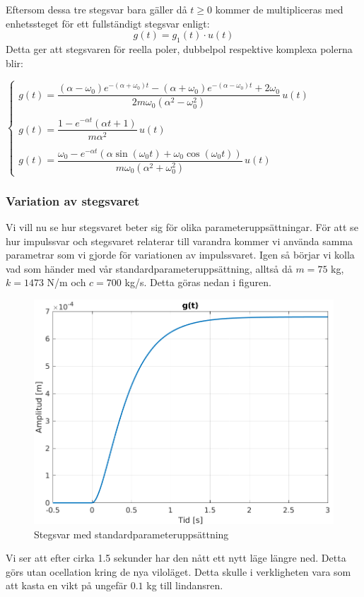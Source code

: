 Eftersom dessa tre stegsvar bara gäller då $t\ge 0$ kommer de multipliceras med enhetssteget för ett fullständigt stegsvar enligt:
$$g(t)=g_1(t)\cdot u(t)$$
Detta ger att stegsvaren för reella poler, dubbelpol respektive komplexa polerna blir:

$\begin{cases}
g(t)=\dfrac{(\alpha-\omega_0)e^{-(\alpha+\omega_0)t}-(\alpha+\omega_0)e^{-(\alpha-\omega_0)t}+2\omega_0}{2m\omega_0(\alpha^2-\omega_0^2)}\,u(t) \\\\
g(t)=\dfrac{1-e^{-\alpha t}(\alpha t+1)}{m\alpha^2}\,u(t) \\\\
g(t)=\dfrac{\omega_0-e^{-\alpha t}(\alpha\sin(\omega_0 t)+\omega_0\cos(\omega_0 t))}{m\omega_0(\alpha^2+\omega_0^2)}\,u(t)
\end{cases}$


\newpage
\subsubsection{Variation av stegsvaret}
Vi vill nu se hur stegsvaret beter sig för olika parameteruppsättningar. För att se hur impulssvar och stegsvaret relaterar till varandra kommer vi använda samma parametrar som vi gjorde för variationen av impulssvaret. Igen så börjar vi kolla vad som händer med vår standardparameteruppsättning, alltså då $m = 75$ kg, $k=1473$ N/m och $c=700$ kg/s. Detta göras nedan i figuren.
\begin{figure}[H]
    \centering
    \includegraphics[scale=0.9]{bilder/stegsvar}
    \caption{Stegsvar med standardparameteruppsättning}
    \label{fig:stegsvar}
\end{figure}
Vi ser att efter cirka 1.5 sekunder har den nått ett nytt läge längre ned. Detta görs utan ocellation kring de nya viloläget. Detta skulle i verkligheten vara som  att kasta en vikt på ungefär $0.1$ kg till lindansren.

